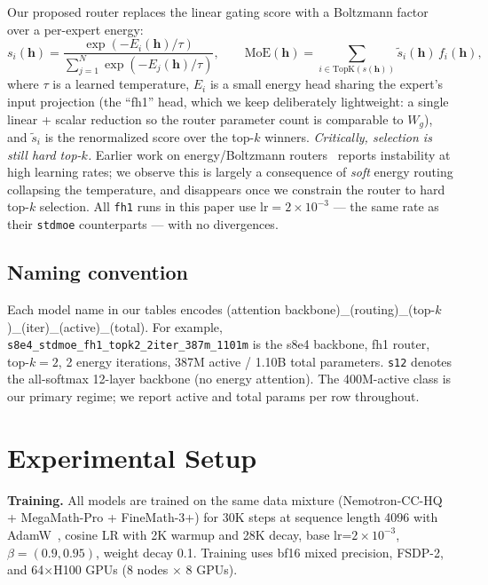 \documentclass[oneside]{article}
\begin{document}
Our proposed router replaces the linear gating score with a Boltzmann factor over a per-expert energy:
\begin{equation}
  s_i(\mathbf{h}) = \frac{\exp(-E_i(\mathbf{h})/\tau)}{\sum_{j=1}^{N} \exp(-E_j(\mathbf{h})/\tau)},\qquad
  \mathrm{MoE}(\mathbf{h}) = \sum_{i\in \mathrm{TopK}(s(\mathbf{h}))} \tilde{s}_i(\mathbf{h})\, f_i(\mathbf{h}),
  \label{eq:fh1}
\end{equation}
where $\tau$ is a learned temperature, $E_i$ is a small energy head sharing the expert's input projection (the ``fh1'' head, which we keep deliberately lightweight: a single linear + scalar reduction so the router parameter count is comparable to $W_g$), and $\tilde{s}_i$ is the renormalized score over the top-$k$ winners. \emph{Critically, selection is still hard top-$k$.} Earlier work on energy/Boltzmann routers~\citep{shazeer2017outrageously} reports instability at high learning rates; we observe this is largely a consequence of \emph{soft} energy routing collapsing the temperature, and disappears once we constrain the router to hard top-$k$ selection. All \texttt{fh1} runs in this paper use $\mathrm{lr}=2\times 10^{-3}$ --- the same rate as their \texttt{stdmoe} counterparts --- with no divergences.

\subsection{Naming convention}

Each model name in our tables encodes (attention backbone)\_(routing)\_(top-$k$)\_(iter)\_(active)\_(total). For example, \texttt{s8e4\_stdmoe\_fh1\_topk2\_2iter\_387m\_1101m} is the s8e4 backbone, fh1 router, top-$k=2$, 2 energy iterations, 387M active / 1.10B total parameters. \texttt{s12} denotes the all-softmax 12-layer backbone (no energy attention). The 400M-active class is our primary regime; we report active and total params per row throughout.


\section{Experimental Setup}

\textbf{Training.} All models are trained on the same data mixture (Nemotron-CC-HQ + MegaMath-Pro + FineMath-3+) for 30K steps at sequence length 4096 with AdamW~\citep{loshchilov2019decoupled}, cosine LR with 2K warmup and 28K decay, base lr=$2\times 10^{-3}$, $\beta=(0.9, 0.95)$, weight decay 0.1. Training uses bf16 mixed precision, FSDP-2, and 64$\times$H100 GPUs (8 nodes $\times$ 8 GPUs).
\end{document}
